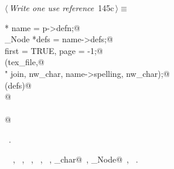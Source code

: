 \documentclass[a4paper]{report}
\begin{document}
\begin{flushleft} \small
\begin{minipage}{\linewidth}\label{scrap317}\raggedright\small
{} $\langle\,${\it Write one use reference}\nobreak\ {\footnotesize {145c}}$\,\rangle\equiv$
\vspace{-1ex}
\begin{list}{}{} \item
\mbox{}\verb@Name * name = p->defn;@\\
\mbox{}\verb@Scrap_Node *defs = name->defs;@\\
\mbox{}\verb@int first = TRUE, page = -1;@\\
\mbox{}\verb@fprintf(tex_file,@\\
\mbox{}\verb@        "%c \\verb%c%s%c\\nobreak\\ ",@\\
\mbox{}\verb@        join, nw_char, name->spelling, nw_char);@\\
\mbox{}\verb@if (defs)@\\
\mbox{}@\\
\mbox{}\verb@else@\\
\mbox{}@\\
\mbox{}\verb@@{\NWsep}
\end{list}
\vspace{-1.5ex}
\footnotesize
\begin{list}{}{\setlength{\itemsep}{-\parsep}\setlength{\itemindent}{-\leftmargin}}
\item \NWtxtMacroRefIn\ .
\item \NWtxtIdentsUsed\nobreak\  \verb@FALSE@\nobreak\ , \verb@first@\nobreak\ , \verb@fprintf@\nobreak\ , \verb@fputs@\nobreak\ , \verb@Name@\nobreak\ , \verb@nw_char@\nobreak\ , \verb@Scrap_Node@\nobreak\ , \verb@TRUE@\nobreak\ .
\item{}
\end{list}
\end{minipage}\vspace{4ex}
\end{flushleft}
\end{document}
